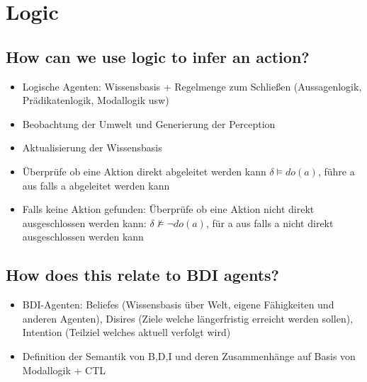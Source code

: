 \section{Logic}
\subsection{How can we use logic to infer an action?}
\begin{itemize}
	\item Logische Agenten: Wissensbasis + Regelmenge zum Schließen (Aussagenlogik, Prädikatenlogik, Modallogik usw)
	\item Beobachtung der Umwelt und Generierung der Perception
	\item Aktualisierung der Wissensbasis
	\item Überprüfe ob eine Aktion direkt abgeleitet werden kann $\delta \vDash do(a)$, führe a aus falls a abgeleitet werden kann
	\item Falls keine Aktion gefunden: Überprüfe ob eine Aktion nicht direkt ausgeschlossen werden kann: $\delta \not \vDash \neg do(a)$, für a aus falls a nicht direkt ausgeschlossen werden kann
\end{itemize}
\subsection{How does this relate to BDI agents?}
\begin{itemize}
	\item BDI-Agenten: Beliefes (Wissensbasis über Welt, eigene Fähigkeiten und anderen Agenten), Disires (Ziele welche längerfristig erreicht werden sollen), Intention (Teilziel welches aktuell verfolgt wird)
	\item Definition der Semantik von B,D,I und deren Zusammenhänge auf Basis von Modallogik + CTL
\end{itemize}
